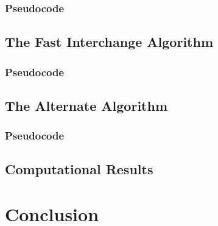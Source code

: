 \documentclass[11pt]{article}
\newcommand{\np}{\newpage}
\begin{document}
	
	\subsubsection{Pseudocode}
	
	
	\subsection{The Fast Interchange Algorithm}
	
	\subsubsection{Pseudocode}
	
	
	\subsection{The Alternate Algorithm}
	
	\subsubsection{Pseudocode}
	
	
	\subsection{Computational Results}
	
	
	
	\section{Conclusion}
		
		
	\np
	
	
	\np

	\printindex[terms]
	\printindex[authors]
	
\end{document}
